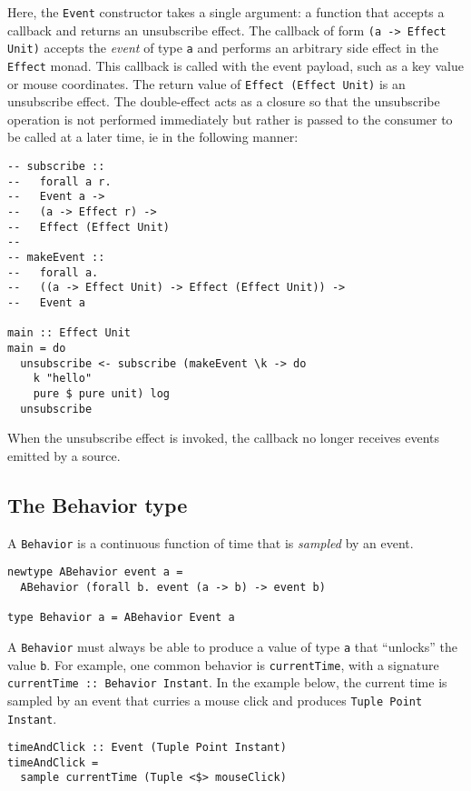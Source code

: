 \documentclass{sig-alternate}
\begin{document}
\begin{sloppypar}
  Here, the \texttt{Event} constructor takes a single argument: a function that accepts a callback and returns an unsubscribe effect. The callback of form \verb=(a -> Effect Unit)= accepts the \textit{event} of type \texttt{a} and performs an arbitrary side effect in the \texttt{Effect} monad.  This callback is called with the event payload, such as a key value or mouse coordinates.  The return value of \texttt{Effect (Effect Unit)} is an unsubscribe effect.  The double-effect acts as a closure so that the unsubscribe operation is not performed immediately but rather is passed to the consumer to be called at a later time, ie in the following manner:

  \begin{verbatim}
-- subscribe ::
--   forall a r.
--   Event a ->
--   (a -> Effect r) ->
--   Effect (Effect Unit)
--
-- makeEvent ::
--   forall a.
--   ((a -> Effect Unit) -> Effect (Effect Unit)) ->
--   Event a

main :: Effect Unit
main = do
  unsubscribe <- subscribe (makeEvent \k -> do
    k "hello"
    pure $ pure unit) log
  unsubscribe
\end{verbatim}

  When the unsubscribe effect is invoked, the callback no longer receives events emitted by a source.

  \subsection{The Behavior type}

  A \texttt{Behavior} is a continuous function of time that is \textit{sampled} by an event.

  \begin{verbatim}
newtype ABehavior event a =
  ABehavior (forall b. event (a -> b) -> event b)

type Behavior a = ABehavior Event a
       \end{verbatim}

  A \texttt{Behavior} must always be able to produce a value of type \texttt{a} that ``unlocks'' the value \texttt{b}. For example, one common behavior is \verb=currentTime=, with a signature \verb=currentTime :: Behavior Instant=. In the example below, the current time is sampled by an event that curries a mouse click and produces \texttt{Tuple Point Instant}.

  \begin{verbatim}
timeAndClick :: Event (Tuple Point Instant)
timeAndClick =
  sample currentTime (Tuple <$> mouseClick)
       \end{verbatim}


\end{sloppypar}
\end{document}

